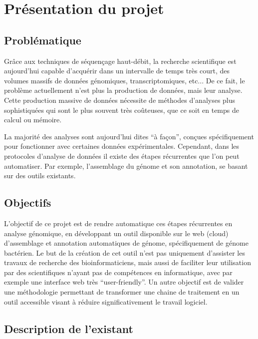 \section{Présentation du projet}

\subsection{Problématique}

Grâce aux techniques de séquençage haut-débit, la recherche scientifique est aujourd’hui capable d’acquérir dans un intervalle de temps très court, des volumes massifs de données génomiques, transcriptomiques, etc... De ce fait, le problème actuellement n’est plus la production de données, mais leur analyse. Cette production massive de données nécessite de méthodes d’analyses plus sophistiquées qui sont le plus souvent très coûteuses, que ce soit en temps de calcul ou mémoire. 

La majorité des analyses sont aujourd’hui dites “à façon”, conçues spécifiquement pour fonctionner avec certaines données expérimentales. Cependant, dans les protocoles d’analyse de données il existe des étapes récurrentes que l’on peut automatiser. Par exemple, l’assemblage du génome et son annotation, se basant sur des outils existants.


\subsection{Objectifs}

L’objectif de ce projet est de rendre automatique ces étapes récurrentes en analyse génomique, en développant un outil disponible sur le web (cloud) d’assemblage et annotation automatiques de génome, spécifiquement de génome bactérien. Le but de la création de cet outil n’est pas uniquement d’assister les travaux de recherche des bioinformaticiens, mais aussi de faciliter leur utilisation par des scientifiques n’ayant pas de compétences en informatique, avec par exemple une interface web très “user-friendly”. Un autre objectif est de valider une méthodologie permettant de transformer une chaine de traitement en un outil accessible visant à réduire significativement le travail logiciel.  



\subsection{Description de l'existant}

